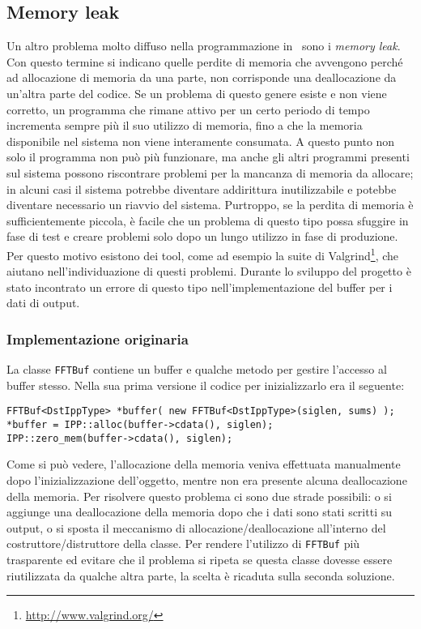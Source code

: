 \subsection{Memory leak}
Un altro problema molto diffuso nella programmazione in \CC\, sono i \emph{memory
leak}. Con questo termine si indicano quelle perdite di memoria che avvengono
perch\'e ad allocazione di memoria da una parte, non corrisponde una
deallocazione da un'altra parte del codice. Se un problema di questo genere
esiste e non viene corretto, un programma che rimane attivo per un certo periodo
di tempo incrementa sempre pi\`u il suo utilizzo di memoria, fino a che la
memoria disponibile nel sistema non viene interamente consumata. A questo punto
non solo il programma non pu\`o pi\`u funzionare, ma anche gli altri programmi
presenti sul sistema possono riscontrare problemi per la mancanza di memoria da
allocare; in alcuni casi il sistema potrebbe diventare addirittura
inutilizzabile e potebbe diventare necessario un riavvio del sistema. Purtroppo,
se la perdita di memoria \`e sufficientemente piccola, \`e facile che un
problema di questo tipo possa sfuggire in fase di test e creare problemi solo
dopo un lungo utilizzo in fase di produzione. Per questo motivo esistono dei
tool, come ad esempio la suite di
Valgrind\footnote{\url{http://www.valgrind.org/}}, che aiutano
nell'individuazione di questi problemi. Durante lo sviluppo del progetto \`e
stato incontrato un errore di questo tipo nell'implementazione del buffer per i
dati di output.

\subsubsection{Implementazione originaria}
La classe \texttt{FFTBuf} contiene un buffer e qualche metodo per gestire
l'accesso al buffer stesso. Nella sua prima versione il codice per
inizializzarlo era il seguente:
\begin{lstlisting}[caption=Inizializzazione di un FFTBuf (vecchia
versione),label=lst:old_fftbuf]
FFTBuf<DstIppType> *buffer( new FFTBuf<DstIppType>(siglen, sums) );
*buffer = IPP::alloc(buffer->cdata(), siglen);
IPP::zero_mem(buffer->cdata(), siglen);
\end{lstlisting}
Come si pu\`o vedere, l'allocazione della memoria veniva effettuata manualmente
dopo l'inizializzazione dell'oggetto, mentre non era presente alcuna
deallocazione della memoria. Per risolvere questo problema ci sono due strade
possibili: o si aggiunge una deallocazione della memoria dopo che i dati sono
stati scritti su output, o si sposta il meccanismo di allocazione/deallocazione
all'interno del costruttore/distruttore della classe. Per rendere l'utilizzo di
\texttt{FFTBuf} pi\`u trasparente ed evitare che il problema si ripeta se questa
classe dovesse essere riutilizzata da qualche altra parte, la scelta \`e
ricaduta sulla seconda soluzione.

